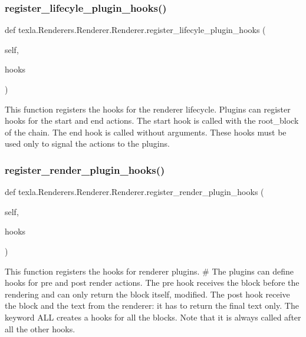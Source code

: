 \subsubsection{\texorpdfstring{register\+\_\+lifecyle\+\_\+plugin\+\_\+hooks()}{register\_lifecyle\_plugin\_hooks()}}
{\footnotesize\ttfamily def texla.\+Renderers.\+Renderer.\+Renderer.\+register\+\_\+lifecyle\+\_\+plugin\+\_\+hooks (\begin{DoxyParamCaption}\item[{}]{self,  }\item[{}]{hooks }\end{DoxyParamCaption})}

\begin{DoxyVerb}This function registers the hooks for the renderer lifecycle.
Plugins can register hooks for the start and end actions.
The start hook is called with the root_block of the chain.
The end hook is called without arguments. These hooks must be used
only to signal the actions to the plugins.\end{DoxyVerb}
 \hypertarget{classtexla_1_1Renderers_1_1Renderer_1_1Renderer_ab2a50912d83684b9cd57fc4feccedad6}{}\label{classtexla_1_1Renderers_1_1Renderer_1_1Renderer_ab2a50912d83684b9cd57fc4feccedad6} 
\subsubsection{\texorpdfstring{register\+\_\+render\+\_\+plugin\+\_\+hooks()}{register\_render\_plugin\_hooks()}}
{\footnotesize\ttfamily def texla.\+Renderers.\+Renderer.\+Renderer.\+register\+\_\+render\+\_\+plugin\+\_\+hooks (\begin{DoxyParamCaption}\item[{}]{self,  }\item[{}]{hooks }\end{DoxyParamCaption})}

\begin{DoxyVerb}This function registers the hooks for renderer plugins.
# The plugins can define hooks for pre and post render actions.
The pre hook receives the block before the rendering and can
only return the block itself, modified.
The post hook receive the block and the text from the renderer:
it has to return the final text only.
The keyword ALL creates a hooks for all the blocks.
Note that it is always called after all the other hooks.\end{DoxyVerb}
 \hypertarget{classtexla_1_1Renderers_1_1Renderer_1_1Renderer_ae58221b6a1aec6777d7e6d1bbc97e254}{}\label{classtexla_1_1Renderers_1_1Renderer_1_1Renderer_ae58221b6a1aec6777d7e6d1bbc97e254} 
